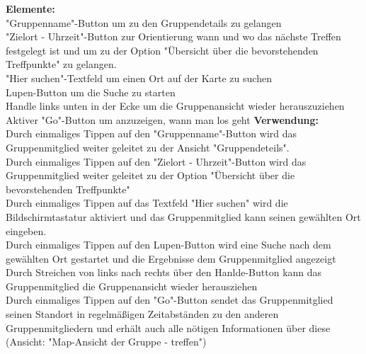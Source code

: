 \textbf{Elemente:}\\
"Gruppenname"-Button um zu den Gruppendetails zu gelangen\\
"Zielort - Uhrzeit"-Button zur Orientierung wann und wo das nächste Treffen festgelegt ist und um zu der Option "Übersicht über die bevorstehenden Treffpunkte" zu gelangen.\\
"Hier suchen"-Textfeld um einen Ort auf der Karte zu suchen\\
Lupen-Button um die Suche zu starten\\
Handle links unten in der Ecke um die Gruppenansicht wieder herauszuziehen\\
Aktiver "Go"-Button um anzuzeigen, wann man los geht
\textbf{Verwendung:}\\
Durch einmaliges Tippen auf den "Gruppenname"-Button wird das Gruppenmitglied weiter geleitet zu der Ansicht "Gruppendeteils".\\
Durch einmaliges Tippen auf den "Zielort - Uhrzeit"-Button wird das Gruppenmitglied weiter geleitet zu der Option "Übersicht über die bevorstehenden Treffpunkte"\\
Durch einmaliges Tippen auf das Textfeld "Hier suchen" wird die Bildschirmtastatur aktiviert und das Gruppenmitglied kann seinen gewählten Ort eingeben.\\
Durch einmaliges Tippen auf den Lupen-Button wird eine Suche nach dem gewählten Ort gestartet und die Ergebnisse dem Gruppenmitglied angezeigt\\
Durch Streichen von links nach rechts über den Hanlde-Button kann das Gruppenmitglied die Gruppenansicht wieder herausziehen\\
Durch einmaliges Tippen auf den "Go"-Button sendet das Gruppenmitglied seinen Standort in regelmäßigen Zeitabständen zu den anderen Gruppenmitgliedern und erhält auch alle nötigen Informationen über diese (Ansicht: "Map-Ansicht der Gruppe - treffen")\\ \\

